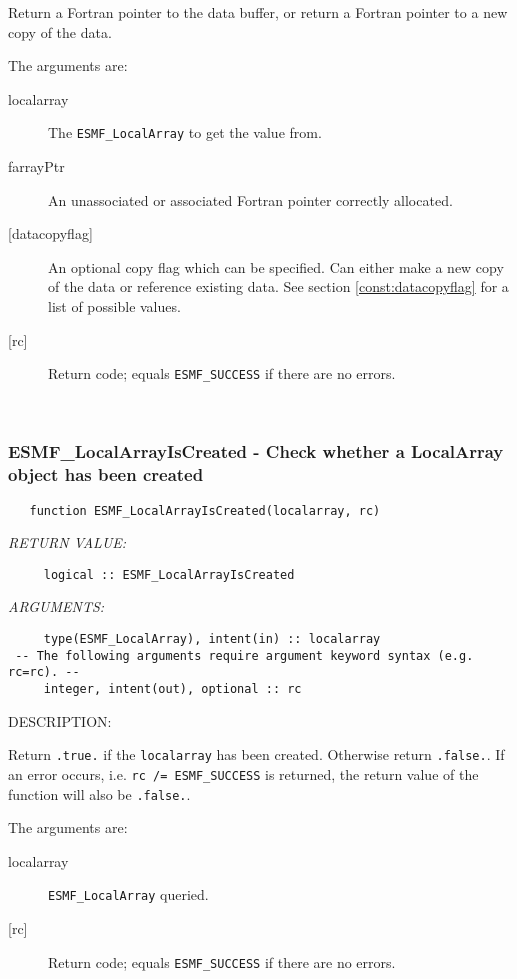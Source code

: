  
   Return a Fortran pointer to the data buffer, or return a Fortran pointer 
   to a new copy of the data. 
   
   The arguments are: 
   \begin{description} 
   \item[localarray] 
   The {\tt ESMF\_LocalArray} to get the value from. 
   \item[farrayPtr] 
   An unassociated or associated Fortran pointer correctly allocated.
   \item[{[datacopyflag]}] 
   An optional copy flag which can be specified. 
   Can either make a new copy of the data or reference existing data. 
   See section \ref{const:datacopyflag} for a list of possible values. 
   \item[{[rc]}] 
   Return code; equals {\tt ESMF\_SUCCESS} if there are no errors. 
   \end{description} 
    
 
\mbox{}\hrulefill\ 
 
\subsubsection [ESMF\_LocalArrayIsCreated] {ESMF\_LocalArrayIsCreated - Check whether a LocalArray object has been created}


\begin{verbatim}   function ESMF_LocalArrayIsCreated(localarray, rc)\end{verbatim}{\em RETURN VALUE:}
\begin{verbatim}     logical :: ESMF_LocalArrayIsCreated\end{verbatim}{\em ARGUMENTS:}
\begin{verbatim}     type(ESMF_LocalArray), intent(in) :: localarray
 -- The following arguments require argument keyword syntax (e.g. rc=rc). --
     integer, intent(out), optional :: rc\end{verbatim}
{\sf DESCRIPTION:\\ }


   Return {\tt .true.} if the {\tt localarray} has been created. Otherwise return
   {\tt .false.}. If an error occurs, i.e. {\tt rc /= ESMF\_SUCCESS} is
   returned, the return value of the function will also be {\tt .false.}.
  
   The arguments are:
   \begin{description}
   \item[localarray]
   {\tt ESMF\_LocalArray} queried.
   \item[{[rc]}]
   Return code; equals {\tt ESMF\_SUCCESS} if there are no errors.
   \end{description}
  
\setlength{\parskip}{\oldparskip}
\setlength{\parindent}{\oldparindent}
\setlength{\baselineskip}{\oldbaselineskip}
